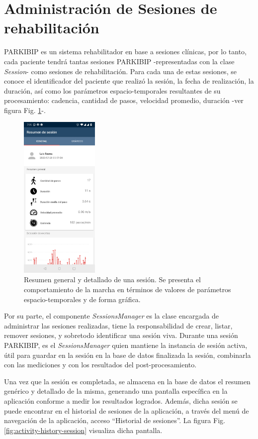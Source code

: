 \section{Administración de Sesiones de rehabilitación}

PARKIBIP es un sistema rehabilitador en base a sesiones clínicas, por lo tanto, cada paciente tendrá tantas sesiones PARKIBIP -representadas con la clase \textit{Session}- como sesiones de rehabilitación. Para cada una de estas sesiones, se conoce el identificador del paciente que realizó la sesión, la fecha de realización, la duración, así como los parámetros espacio-temporales resultantes de su procesamiento: cadencia, cantidad de pasos, velocidad promedio, duración -ver figura Fig. \ref{fig:activity-summary}-.

\newpage

\begin{figure}[H]
 \centering
 \includegraphics[height=8cm]{TESIS/imagenes/chap05/activity-session-summary.JPG}
 \caption{Resumen general y detallado de una sesión. Se presenta el comportamiento de la marcha en términos de valores de parámetros espacio-temporales y de forma gráfica.}
 \label{fig:activity-summary}
\end{figure}

Por su parte, el componente \textit{SessionsManager} es la clase encargada de administrar las sesiones realizadas, tiene la responsabilidad de crear, listar, remover sesiones, y sobretodo identificar una sesión viva. Durante una sesión PARKIBIP, es el \textit{SessionsManager} quien mantiene la instancia de sesión activa, útil para guardar en la sesión en la base de datos finalizada la sesión, combinarla con las mediciones y con los resultados del post-procesamiento. 

Una vez que la sesión es completada, se almacena en la base de datos el resumen genérico y detallado de la misma, generando una pantalla específica en la aplicación conforme a medir los resultados logrados. Además, dicha sesión se puede encontrar en el historial de sesiones de la aplicación, a través del menú de navegación de la aplicación, acceso ``Historial de sesiones''. La figura Fig. \ref{fig:activity-history-session} visualiza dicha pantalla. 

